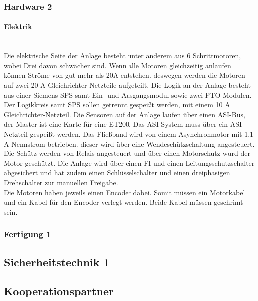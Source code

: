 \subsubsection{Hardware 2}

\paragraph{Elektrik}\mbox{}\\
Die elektrische Seite der Anlage besteht unter anderem aus 6 Schrittmotoren, wobei Drei davon schwächer sind. Wenn alle Motoren gleichzeitig anlaufen können Ströme von gut mehr als 20A entstehen. deswegen werden die Motoren auf zwei 20 A Gleichrichter-Netzteile aufgeteilt. Die Logik an der Anlage besteht aus einer Siemens SPS samt Ein- und Ausgangsmodul sowie zwei PTO-Modulen. Der Logikkreis samt SPS sollen getrennt gespeißt werden, mit einem 10 A Gleichrichter-Netzteil. Die Sensoren auf der Anlage laufen über einen ASI-Bus, der Master ist eine Karte für eine ET200. Das ASI-System muss über ein ASI-Netzteil gespeißt werden. Das Fließband wird von einem Asynchronmotor mit 1.1 A Nennstrom betrieben. dieser wird über eine Wendeschützschaltung angesteuert. Die Schütz werden von Relais angesteuert und über einen Motorschutz wurd der Motor geschützt. Die Anlage wird über einen FI und einen Leitungsschutzschalter abgesichert und hat zudem einen Schlüsselschalter und einen dreiphasigen Drehschalter zur manuellen Freigabe.\\
Die Motoren haben jeweils einen Encoder dabei. Somit müssen ein Motorkabel und ein Kabel für den Encoder verlegt werden. Beide Kabel müssen geschrimt sein. 

\subsubsection{Fertigung 1}

\subsection{Sicherheitstechnik 1}

\subsection{Kooperationspartner}